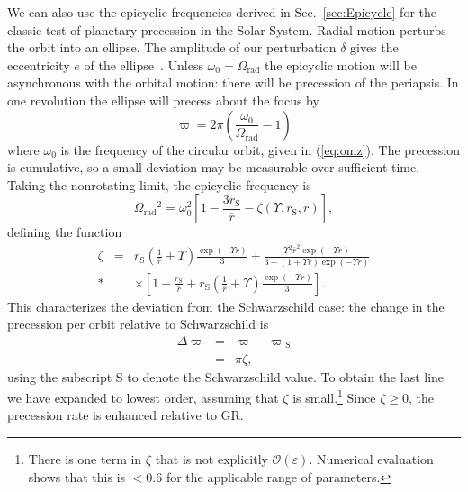 \documentclass[aps,prd,amsfonts,amssymb,amsmath,nofootinbib,reprint,showpacs]{revtex4-1}
\newcommand{\eqnref}[1]{(\ref{eq:#1})}
\newcommand{\secref}[1]{Sec.\ \ref{sec:#1}}
\newcommand{\sub}[1]{\ensuremath{_\text{#1}}}
\newcommand{\recip}[1]{\ensuremath{\frac{1}{#1}}}
\newcommand{\order}[1]{\ensuremath{\mathcal{O}({#1})}}
\begin{document}
We can also use the epicyclic frequencies derived in \secref{Epicycle} for the classic test of planetary precession in the Solar System. Radial motion perturbs the orbit into an ellipse. The amplitude of our perturbation $\delta$ gives the eccentricity $e$ of the ellipse~\cite{Kerner2001a}. Unless $\omega_0 = \Omega\sub{rad}$ the epicyclic motion will be asynchronous with the orbital motion: there will be precession of the periapsis. In one revolution the ellipse will precess about the focus by
\begin{equation}
\varpi = 2\pi\left(\frac{\omega_0}{\Omega\sub{rad}} - 1\right)
\end{equation}
where $\omega_0$ is the frequency of the circular orbit, given in \eqnref{omz}. The precession is cumulative, so a small deviation may be measurable over sufficient time. Taking the nonrotating limit, the epicyclic frequency is
\begin{equation}
\Omega\sub{rad}^2 = \omega_0^2 \left[1 - \frac{3r\sub{S}}{\overline{r}} - \zeta(\Upsilon,r\sub{S},\overline{r})\right],
\end{equation}
defining the function
\begin{eqnarray}
\zeta & = & r\sub{S}\left(\recip{\overline{r}} + \Upsilon\right)\frac{\exp(-\Upsilon r)}{3} + \frac{\Upsilon^2\overline{r}^2\exp(-\Upsilon r)}{3 + (1 + \Upsilon \overline{r})\exp(-\Upsilon r)} \nonumber \\*
& &  \times \left[1 - \frac{r\sub{S}}{\overline{r}} + r\sub{S}\left(\recip{\overline{r}} + \Upsilon\right)\frac{\exp(-\Upsilon r)}{3}\right].
\end{eqnarray}
This characterizes the deviation from the Schwarzschild case: the change in the precession per orbit relative to Schwarzschild is
\begin{eqnarray}
\Delta \varpi & = & \varpi - \varpi\sub{S} \\
 & = & \pi\zeta,
\end{eqnarray}
using the subscript $\text{S}$ to denote the Schwarzschild value. To obtain the last line we have expanded to lowest order, assuming that $\zeta$ is small.\footnote{There is one term in $\zeta$ that is not explicitly $\order{\varepsilon}$. Numerical evaluation shows that this is $< 0.6$ for the applicable range of parameters.} Since $\zeta \geq 0$, the precession rate is enhanced relative to GR.
\end{document}
